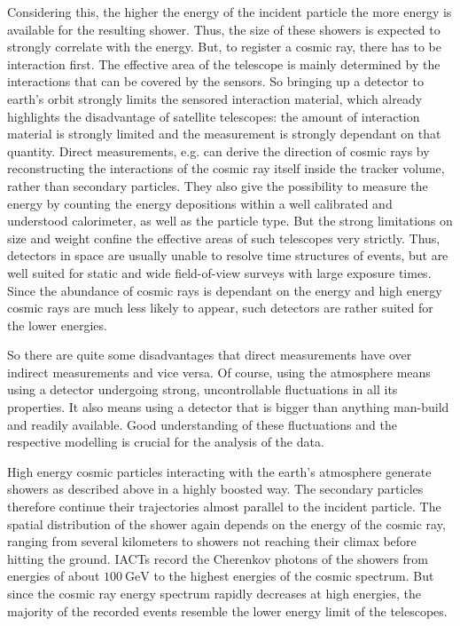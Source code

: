 Considering this, the higher the energy of the incident particle the more
energy is available for the resulting shower. Thus, the size of these showers
is expected to strongly correlate with the energy. But, to register a cosmic
ray, there has to be interaction first. The effective area of the telescope
is mainly determined by the interactions that can be covered by the sensors. So
bringing up a detector to earth's orbit strongly limits the sensored
interaction material, which already highlights the disadvantage of satellite
telescopes: the amount of interaction material is strongly limited and the
measurement is strongly dependant on that quantity. Direct measurements, e.g.
can derive the direction of cosmic rays by reconstructing the interactions of
the cosmic ray itself inside the tracker volume, rather than secondary
particles. They also give the possibility to measure the energy by counting the
energy depositions within a well calibrated and understood calorimeter, as well
as the particle type. But the strong limitations on size and weight confine the
effective areas of such telescopes very strictly. Thus, detectors in space are
usually unable to resolve time structures of events, but are well suited for
static and wide field-of-view surveys with large exposure times. Since the
abundance of cosmic rays is dependant on the energy and high energy cosmic rays
are much less likely to appear, such detectors are rather suited for the lower
energies.

So there are quite some disadvantages that direct measurements have over
indirect measurements and vice versa. Of course, using the atmosphere means
using a detector undergoing strong, uncontrollable fluctuations in all its
properties. It also means using a detector that is bigger than anything
man-build and readily available. Good understanding of these fluctuations and
the respective modelling is crucial for the analysis of the data.

High energy cosmic particles interacting with the earth's atmosphere generate
showers as described above in a highly boosted way. The secondary particles
therefore continue their trajectories almost parallel to the incident particle.
The spatial distribution of the shower again depends on the energy of the
cosmic ray, ranging from several kilometers to showers not reaching their
climax before hitting the ground. IACTs record the Cherenkov photons of the
showers from energies of about $\SI{100}{\giga\electronvolt}$ to the highest
energies of the cosmic spectrum. But since the cosmic ray energy spectrum
rapidly decreases at high energies, the majority of the recorded events
resemble the lower energy limit of the telescopes.
